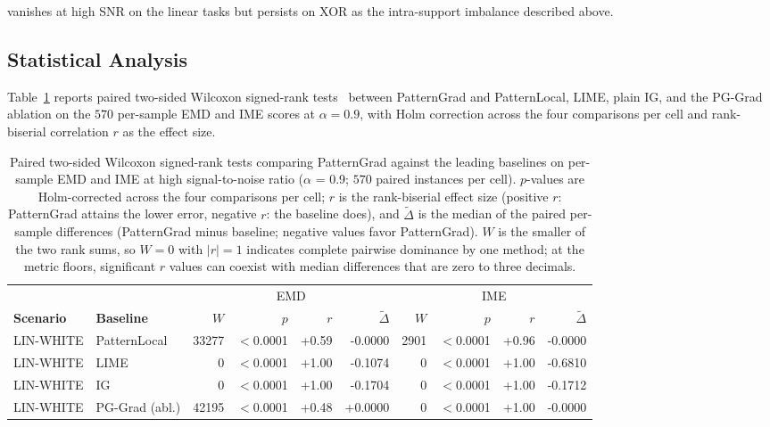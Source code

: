 \documentclass[pdflatex,sn-mathphys-num]{sn-jnl}
\theoremstyle{thmstyleone}
\theoremstyle{thmstyletwo}%
\theoremstyle{thmstylethree}%
\begin{document}
vanishes at high SNR on the linear tasks but persists on XOR as the intra-support imbalance described above.

\subsection{Statistical Analysis}\label{sec:res_stats}

Table~\ref{tab:wilcoxon} reports paired two-sided Wilcoxon signed-rank tests~\cite{wilcoxon1945} between PatternGrad and PatternLocal, LIME, plain IG, and the PG-Grad ablation on the $570$ per-sample EMD and IME scores at $\alpha = 0.9$, with Holm correction across the four comparisons per cell and rank-biserial correlation $r$ as the effect size.

\begin{table}[t]
\centering
\caption{Paired two-sided Wilcoxon signed-rank tests comparing PatternGrad against the leading baselines on per-sample EMD and IME at high signal-to-noise ratio ($\alpha$ = 0.9; $570$ paired instances per cell). $p$-values are Holm-corrected across the four comparisons per cell; $r$ is the rank-biserial effect size (positive $r$: PatternGrad attains the lower error, negative $r$: the baseline does), and $\widetilde{\Delta}$ is the median of the paired per-sample differences (PatternGrad minus baseline; negative values favor PatternGrad). $W$ is the smaller of the two rank sums, so $W = 0$ with $|r| = 1$ indicates complete pairwise dominance by one method; at the metric floors, significant $r$ values can coexist with median differences that are zero to three decimals.}
\footnotesize
\setlength{\tabcolsep}{2.6pt}
\label{tab:wilcoxon}
\begin{tabular}{ll rrrr rrrr}
\toprule
& & \multicolumn{4}{c}{EMD} & \multicolumn{4}{c}{IME}\\
\cmidrule(lr){3-6}\cmidrule(lr){7-10}
\textbf{Scenario} & \textbf{Baseline} & $W$ & $p$ & $r$ & $\widetilde{\Delta}$ & $W$ & $p$ & $r$ & $\widetilde{\Delta}$\\
\midrule
LIN-WHITE & PatternLocal & 33277 & $<$0.0001 & +0.59 & -0.0000 & 2901 & $<$0.0001 & +0.96 & -0.0000 \\
LIN-WHITE & LIME & 0 & $<$0.0001 & +1.00 & -0.1074 & 0 & $<$0.0001 & +1.00 & -0.6810 \\
LIN-WHITE & IG & 0 & $<$0.0001 & +1.00 & -0.1704 & 0 & $<$0.0001 & +1.00 & -0.1712 \\
LIN-WHITE & PG-Grad (abl.) & 42195 & $<$0.0001 & +0.48 & +0.0000 & 0 & $<$0.0001 & +1.00 & -0.0000 \\

\end{tabular}
\end{table}
\end{document}
